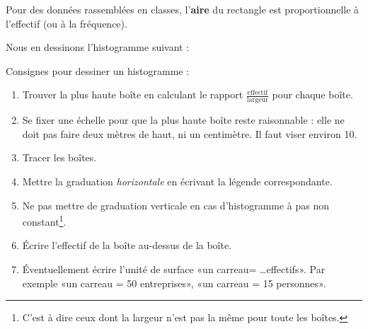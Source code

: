 \begin{Aretenir}
Pour des données rassemblées en classes, l'\textbf{aire} du rectangle est proportionnelle à l'effectif (ou à la fréquence). 
\end{Aretenir}

Nous en dessinons l'histogramme suivant :
\begin{center}
   
\end{center}


Consignes pour dessiner un histogramme :
\begin{enumerate}
    \item
        Trouver la plus haute boîte en calculant le rapport \( \frac{ \text{effectif} }{ \text{largeur} }\) pour chaque boîte.
    \item
        Se fixer une échelle pour que la plus haute boîte reste raisonnable : elle ne doit pas faire deux mètres de haut, ni un centimètre. Il faut viser environ \unit{10}{\centi\meter}.
    \item
        Tracer les boîtes.
    \item
        Mettre la graduation \emph{horizontale} en écrivant la légende correspondante.
    \item
        Ne pas mettre de graduation verticale en cas d'histogramme à pas non constant\footnote{C'est à dire ceux dont la largeur n'est pas la même pour toute les boîtes.}.
    \item
        Écrire l'effectif de la boîte au-dessus de la boîte.
    \item
        Éventuellement écrire l'unité de surface «un carreau= \ldots effectifs». Par exemple «un carreau = 50 entreprises», «un carreau = 15 personnes».
\end{enumerate}



